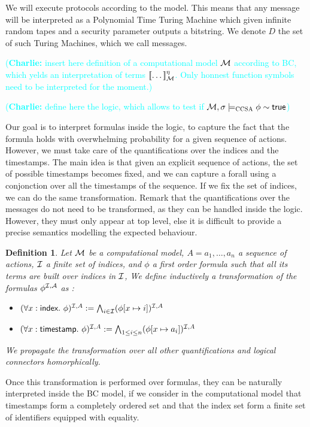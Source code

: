 \documentclass[a4paper]{article}
\newtheorem{definition}{Definition}
\theoremstyle{remark}
\newcommand{\charlie}[1]{\textcolor{cyan}{(\textbf{Charlie:} #1)}}
\begin{document}
We will execute protocols according to the \BC model. This means that any message will be interpreted as a Polynomial Time Turing Machine which given infinite random tapes and a security parameter outputs a bitstring. We denote $D$ the set of such Turing Machines, which we call messages.

\charlie{insert here definition of a computational model $\mathcal{M}$ according to BC, which yelds an interpretation of terms $[\![\dots]\!]_{\mathcal{M}}^\eta$. Only honnest function symbols need to be interpreted for the moment.}


\charlie{define here the \BC logic, which allows to test if $\mathcal{M},\sigma \models_\textsc{CCSA} \phi \sim \textsf{true}$}

Our goal is to interpret formulas inside the \BC logic, to capture the fact that the formula holds with overwhelming probability for a given sequence of actions. However, we must take care of the quantifications over the indices and the timestamps. The main idea is that given an explicit sequence of actions, the set of possible timestamps becomes fixed, and we can capture a forall using a conjonction over all the timestamps of the sequence. If we fix the set of indices, we can do the same transformation. Remark that the quantifications over the messages do not need to be transformed, as they can be handled inside the \BC logic. However, they must only appear at top level, else it is difficult to provide a precise semantics modelling the expected behaviour.

\begin{definition}
  Let $\mathcal{M}$ be a computational model, $A = a_1,\dots, a_n$  a sequence of actions, $\mathcal{I}$ a finite set of indices, and $\phi$ a first order formula such that all its terms are built over indices in $\mathcal{I}$,
  We define inductively a transformation of the formulas $\phi^{\mathcal{I},\mathcal{A}}$ as :
  \begin{itemize}
 \item $ (\forall x:\textsf{index}.\ \phi) ^{\mathcal{I},A} :=  \bigwedge_{i\in \mathcal{I}} (\phi[x \mapsto i])^{\mathcal{I},A}$
 \item $ (\forall x:\timestamp.\ \phi)^{\I,A} := \bigwedge_{1 \leq i \leq n} (\phi\replace{x}{a_i})^{\I,A}$

  \end{itemize}
We propagate the transformation over all other quantifications and logical connectors homorphically.
\end{definition}

Once this transformation is performed over formulas, they can be naturally interpreted inside the BC model, if we consider in the computational model that timestamps form a completely ordered set and that the index set form a finite set of identifiers equipped with equality.
\end{document}
